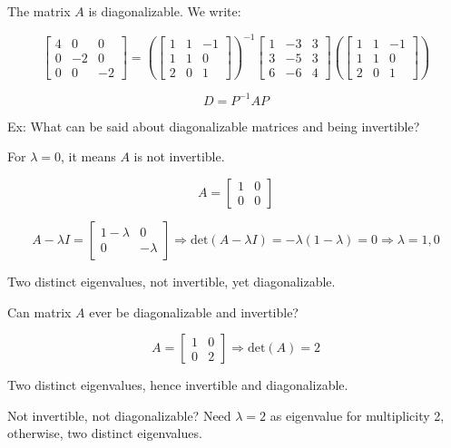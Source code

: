 \documentclass{article}
\begin{document}
The matrix \( A \) is diagonalizable. We write:

\[ \begin{bmatrix} 4 & 0 & 0 \\ 0 & -2 & 0 \\ 0 & 0 & -2 \end{bmatrix} = \left( \begin{bmatrix} 1 & 1 & -1 \\ 1 & 1 & 0 \\ 2 & 0 & 1 \end{bmatrix} \right)^{-1} \begin{bmatrix} 1 & -3 & 3 \\ 3 & -5 & 3 \\ 6 & -6 & 4 \end{bmatrix} \left( \begin{bmatrix} 1 & 1 & -1 \\ 1 & 1 & 0 \\ 2 & 0 & 1 \end{bmatrix} \right) \]

\[ D = P^{-1}AP \]

Ex: What can be said about diagonalizable matrices and being invertible?

For \( \lambda = 0 \), it means \( A \) is not invertible.

\[ A = \begin{bmatrix} 1 & 0 \\ 0 & 0 \end{bmatrix} \]

\[ A-\lambda I = \begin{bmatrix} 1-\lambda & 0 \\ 0 & -\lambda \end{bmatrix} \Rightarrow \text{det}(A-\lambda I) = -\lambda(1-\lambda) = 0 \Rightarrow \lambda = 1, 0 \]

Two distinct eigenvalues, not invertible, yet diagonalizable.

Can matrix \( A \) ever be diagonalizable and invertible?

\[ A = \begin{bmatrix} 1 & 0 \\ 0 & 2 \end{bmatrix} \Rightarrow \text{det}(A) = 2 \]

Two distinct eigenvalues, hence invertible and diagonalizable.

Not invertible, not diagonalizable? Need \( \lambda = 2 \) as eigenvalue for multiplicity 2, otherwise, two distinct eigenvalues.
\end{document}
